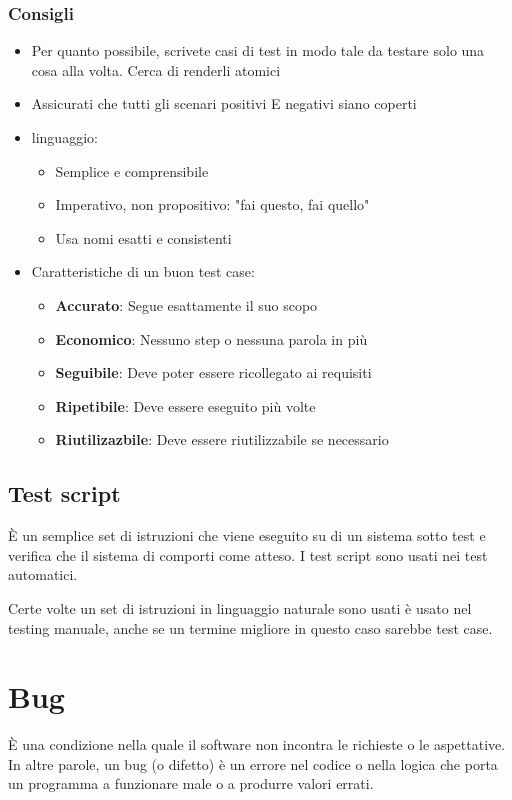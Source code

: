 \documentclass[11pt,a4paper]{book}
\begin{document}
\subsection{Consigli}
\begin{itemize}
	\item Per quanto possibile, scrivete casi di test in modo tale da testare solo una cosa alla volta. Cerca di renderli atomici
	\item Assicurati che tutti gli scenari positivi E negativi siano coperti
	\item linguaggio:
		\begin{itemize}
			\item Semplice e comprensibile
			\item Imperativo, non propositivo: "fai questo, fai quello"
			\item Usa nomi esatti e consistenti	
		\end{itemize}
	\item Caratteristiche di un buon test case:
		\begin{itemize}
			\item \textbf{Accurato}: Segue esattamente il suo scopo
			\item \textbf{Economico}: Nessuno step o nessuna parola in più
			\item \textbf{Seguibile}: Deve poter essere ricollegato ai requisiti
			\item \textbf{Ripetibile}: Deve essere eseguito più volte
			\item \textbf{Riutilizazbile}: Deve essere riutilizzabile se necessario
		\end{itemize}
\end{itemize}

\section{Test script}
È un semplice set di istruzioni che viene eseguito su di un sistema sotto test e verifica che il sistema di comporti come atteso. I test script sono usati nei test automatici.

Certe volte un set di istruzioni in linguaggio naturale sono usati è usato nel testing manuale, anche se un termine migliore in questo caso sarebbe test case.

\chapter{Bug}
È una condizione nella quale il software non incontra le richieste o le aspettative. In altre parole, un bug (o difetto) è un errore nel codice o nella logica che porta un programma a funzionare male o a produrre valori errati.
\end{document}
